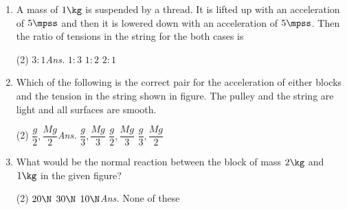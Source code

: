 \documentclass{article}
\newcommand{\ans}{\textcolor{red!95}{\textit{\quad Ans.}}}
\begin{document}
\begin{enumerate}
\item A mass of $1\kg$ is suspended by a thread. It is lifted up with an acceleration of $5\mpss$ and then it is lowered down with an acceleration of $5\mpss$. Then the ratio of tensions in the string for the both cases is
\begin{center}
\end{center}
\begin{tasks}(2)
	\task $3:1$\ans
	\task $1:3$
	\task $1:2$
	\task $2:1$
\end{tasks}

\item Which of the following is the correct pair for the acceleration of either blocks and the tension in the string shown in figure. The pulley and the string are light and all surfaces are smooth.
\begin{center}
\end{center}
\begin{tasks}(2)
	\task $\dfrac{g}{2}, \dfrac{Mg}{2}$\ans
	\task $\dfrac{g}{3}, \dfrac{Mg}{3}$
	\task $\dfrac{g}{2}, \dfrac{Mg}{3}$
	\task $\dfrac{g}{3}, \dfrac{Mg}{2}$
\end{tasks}

\item What would be the normal reaction between the block of mass $2\kg$ and $1\kg$ in the given figure?
\begin{center}
\end{center}
\begin{tasks}(2)
	\task $20\N$
	\task $30\N$
	\task $10\N$\ans
	\task None of these
\end{tasks}


\end{enumerate}
\end{document}
